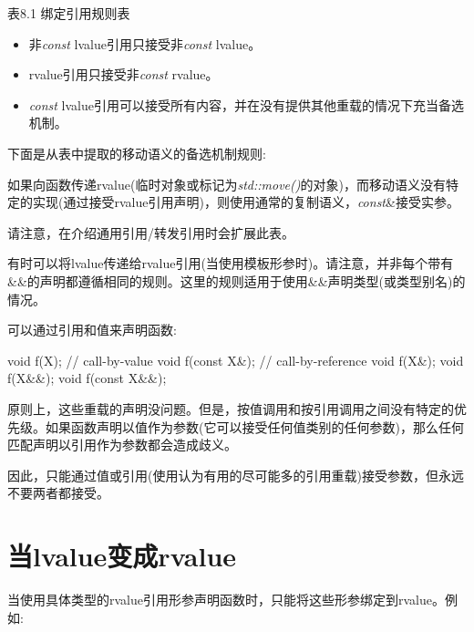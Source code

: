 表8.1 绑定引用规则表


\begin{itemize}
  \item 非\textit{const} lvalue引用只接受非\textit{const} lvalue。
  \item rvalue引用只接受非\textit{const} rvalue。
  \item \textit{const} lvalue引用可以接受所有内容，并在没有提供其他重载的情况下充当备选机制。
\end{itemize}

下面是从表中提取的移动语义的备选机制规则:\par


如果向函数传递rvalue(临时对象或标记为\textit{std::move()}的对象)，而移动语义没有特定的实现(通过接受rvalue引用声明)，则使用通常的复制语义，\textit{const}\&接受实参。\par

请注意，在介绍通用引用/转发引用时会扩展此表。\par

有时可以将lvalue传递给rvalue引用(当使用模板形参时)。请注意，并非每个带有\&\&的声明都遵循相同的规则。这里的规则适用于使用\&\&声明类型(或类型别名)的情况。\par


可以通过引用和值来声明函数:\par

\begin{codebox}[cpp]
void f(X); // call-by-value
void f(const X&); // call-by-reference
void f(X&);
void f(X&&);
void f(const X&&);
\end{codebox}

原则上，这些重载的声明没问题。但是，按值调用和按引用调用之间没有特定的优先级。如果函数声明以值作为参数(它可以接受任何值类别的任何参数)，那么任何匹配声明以引用作为参数都会造成歧义。\par

因此，只能通过值或引用(使用认为有用的尽可能多的引用重载)接受参数，但永远不要两者都接受。\par


\section{当lvalue变成rvalue}

当使用具体类型的rvalue引用形参声明函数时，只能将这些形参绑定到rvalue。例如:\par

